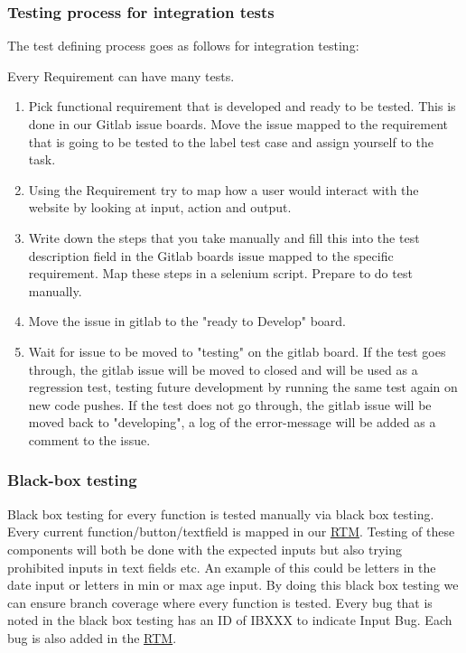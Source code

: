 \subsubsection{Testing process for integration tests}
The test defining process goes as follows for integration testing:

Every Requirement can have many tests.

\begin{enumerate}
    \item Pick functional requirement that is developed and ready to be tested. This is done in our Gitlab issue boards. Move the issue mapped to the requirement that is going to be tested to the label test case and assign yourself to the task.
    \item Using the Requirement try to map how a user would interact with the website by looking at input, action and output. 
    \item Write down the steps that you take manually and fill this into the test description field in the Gitlab boards issue mapped to the specific requirement.
    \subitem Map these steps in a selenium script.
    \subitem Prepare to do test manually.
    \item Move the issue in gitlab to the "ready to Develop" board.
    \item Wait for issue to be moved to "testing" on the gitlab board.
    \subitem If the test goes through, the gitlab issue will be moved to closed and will be used as a regression test, testing future development by running the same test again on new code pushes. 
    \subitem If the test does not go through, the gitlab issue will be moved back to "developing", a log of the error-message will be added as a comment to the issue.
\end{enumerate}




\subsubsection{Black-box testing}
Black box testing for every function is tested manually via black box testing. Every current function/button/textfield is mapped in our \href{https://gitlab.liu.se/tddc88-company-3-2020/deploy/-/tree/Document_branch/RTM}{\underline RTM}. Testing of these components will both be done with the expected inputs but also trying prohibited inputs in text fields etc. An example of this could be letters in the date input or letters in min or max age input. By doing this black box testing we can ensure branch coverage where every function is tested. Every bug that is noted in the black box testing has an ID of IBXXX to indicate Input Bug. Each bug is also added in the \href{https://gitlab.liu.se/tddc88-company-3-2020/deploy/-/tree/Document_branch/RTM}{\underline RTM}.


